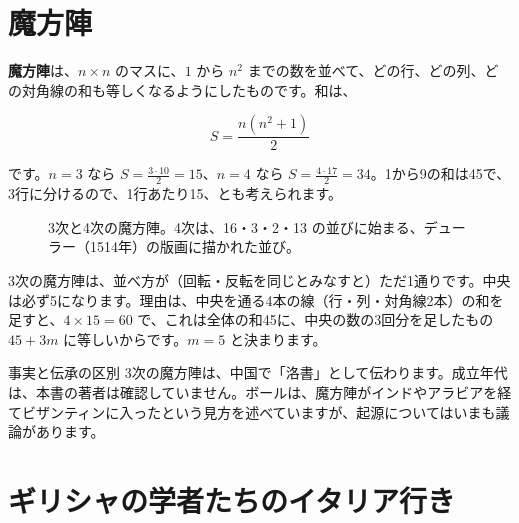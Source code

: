 \documentclass[a4paper,11pt,openany]{ltjsbook}
\begin{document}
\section{魔方陣}

\textbf{魔方陣}は、$n\times n$ のマスに、$1$ から $n^2$ までの数を並べて、どの行、どの列、どの対角線の和も等しくなるようにしたものです。和は、

\[
S=\frac{n(n^2+1)}{2}
\]

です。$n=3$ なら $S=\tfrac{3\cdot10}{2}=15$、$n=4$ なら $S=\tfrac{4\cdot17}{2}=34$。1から9の和は45で、3行に分けるので、1行あたり15、とも考えられます。

\begin{figure}[htbp]
\centering
{}
\caption{3次と4次の魔方陣。4次は、16・3・2・13 の並びに始まる、デューラー（1514年）の版画に描かれた並び。}
\end{figure}

3次の魔方陣は、並べ方が（回転・反転を同じとみなすと）ただ1通りです。中央は必ず5になります。理由は、中央を通る4本の線（行・列・対角線2本）の和を足すと、$4\times15=60$ で、これは全体の和45に、中央の数の3回分を足したもの $45+3m$ に等しいからです。$m=5$ と決まります。

\begin{notebox}{事実と伝承の区別}
3次の魔方陣は、中国で「洛書」として伝わります。成立年代は、本書の著者は確認していません。ボールは、魔方陣がインドやアラビアを経てビザンティンに入ったという見方を述べていますが、起源についてはいまも議論があります。
\end{notebox}

\section{ギリシャの学者たちのイタリア行き}
\end{document}
